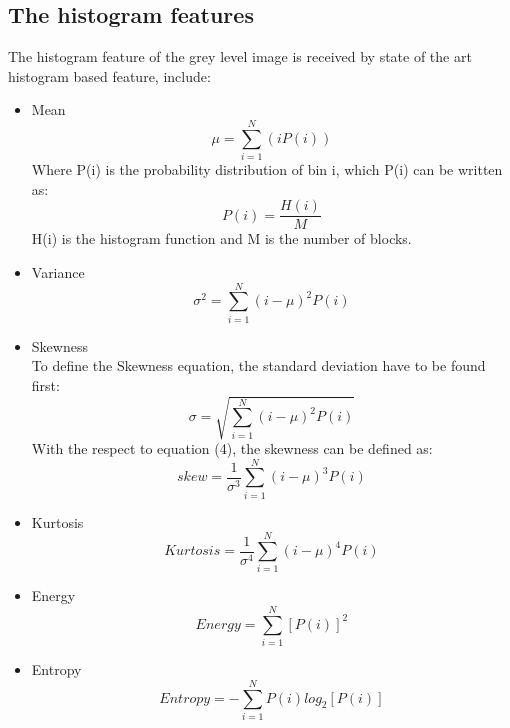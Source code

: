 \documentclass[review]{elsarticle}
\begin{document}
\subsection{The histogram features }
The histogram feature of the grey level image is received by state of the art histogram based feature, include: 
\begin{itemize}
	\item Mean
	\begin{equation}
	\mu= \sum_{i=1}^N (iP(i))
	\end{equation}
	Where  	P(i) is the probability distribution of bin i, which P(i) can be written as: 
	\begin{equation}
	P(i) =\dfrac{H(i)}{M}
	\end{equation}
	\hspace{1cm}H(i) is the histogram function and M is the number of blocks.
	
	
	\item Variance
	\begin{equation}
	\sigma^2= \sum_{i=1}^N (i - \mu)^2P(i)
	\end{equation}
	
	
	\item Skewness \\
	To define the Skewness equation, the standard deviation have to be found first: 
	\begin{equation}
	\sigma = \sqrt{ \sum_{i=1}^N (i - \mu)^2 P(i)}
	\end{equation}
	With the respect to equation (4), the skewness can be defined as: 
	\begin{equation}
	skew = \dfrac{1}{\sigma^3} \sum_{i=1}^N (i - \mu)^3 P(i)
	\end{equation}
	
	\item Kurtosis 
	\begin{equation}
	Kurtosis = \dfrac{1}{\sigma^4} \sum_{i=1}^N (i - \mu)^4 P(i)
	\end{equation}
	
	\item Energy 
	\begin{equation}
	Energy= \sum_{i=1}^N [P(i)]^2
	\end{equation}
	
	
	\item Entropy 
	\begin{equation}
	Entropy= - \sum_{i=1}^N P(i) log_2 [P(i)]
	\end{equation}
\end{itemize}
\end{document}
